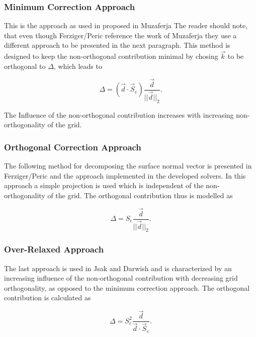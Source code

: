       \subsubsection{Minimum Correction Approach}

      This is the approach as used in proposed in Muzaferja The reader should note, that even though Ferziger/Peric reference the work of Muzaferja they use a different approach to be presented in the next paragraph. This method is designed to keep the non-orthogonal contribution minimal by chosing \(\vec{k}\) to be orthogonal to \(\Delta\), which leads to

      \begin{displaymath}
        \Delta = \left( \vec{d} \cdot \vec{S}_e \right) \frac{\vec{d}}{||\vec{d}||_2}.
      \end{displaymath}

      The Influence of the non-orthogonal contribution increases with increasing non-orthogonality of the grid.

      \subsubsection{Orthogonal Correction Approach}

      The following method for decomposing the surface normal vector is presented in Ferziger/Peric and the approach implemented in the developed solvers. In this approach a simple projection is used which is independent of the non-orthogonality of the grid. The orthogonal contribution thus is modelled as

      \begin{displaymath}
        \Delta =  S_e \frac{\vec{d}}{ ||\vec{d}||_2}.
      \end{displaymath}

      \subsubsection{Over-Relaxed Approach}

      The last approach is used in Jsak and Darwish and is characterized by an increasing influence of the non-orthogonal contribution with decreasing grid orthogonality, as opposed to the minimum correction approach. The orthogonal contribution is calculated as

      \begin{displaymath}
        \Delta =  S_e^2 \frac{\vec{d}}{ \vec{d} \cdot \vec{S}_e }.
      \end{displaymath} 

